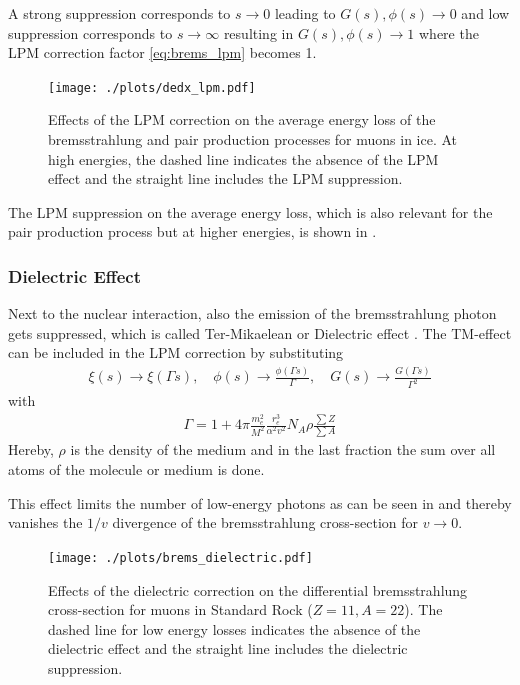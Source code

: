 A strong suppression corresponds to $s \to 0$ leading to $G(s), \phi(s) \to 0$ and low suppression corresponds to $s \to \infty$ resulting in $G(s), \phi(s) \to 1$ where the LPM correction factor \eqref{eq:brems_lpm} becomes 1.
\begin{figure}
    \centering
    \texttt{[image: ./plots/dedx\_lpm.pdf]}
    \caption{Effects of the LPM correction on the average energy loss of the bremsstrahlung and pair production processes for muons in ice. At high energies, the dashed line indicates the absence of the LPM effect and the straight line includes the LPM suppression.}
    \label{fig:dedx_lpm}
\end{figure}

The LPM suppression on the average energy loss, which is also relevant for the pair production process but at higher energies, is shown in .

\subsubsection{Dielectric Effect}

Next to the nuclear interaction, also the emission of the bremsstrahlung photon gets suppressed, which is called Ter-Mikaelean or Dielectric effect \cite{TerMikaelian54, TerMikaelian72}.
The TM-effect can be included in the LPM correction by substituting
\begin{align}
    \xi(s) \to \xi(\Gamma s), \quad
    \phi(s) \to \frac{\phi(\Gamma s)}{\Gamma}, \quad
    G(s) \to \frac{G(\Gamma s)}{\Gamma^2}
\end{align}
with
\begin{align}
    \Gamma = 1 + 4\pi \frac{m_e^2}{M^2} \frac{r_e^3}{\alpha^2v^2} N_A \rho \frac{\sum Z}{\sum A}
\end{align}
Hereby, $\rho$ is the density of the medium and in the last fraction the sum over all atoms of the molecule or medium is done.

This effect limits the number of low-energy photons as can be seen in  and thereby vanishes the $1/v$ divergence of the bremsstrahlung cross-section for $v \to 0$.
\begin{figure}
    \centering
    \texttt{[image: ./plots/brems\_dielectric.pdf]}
    \caption{Effects of the dielectric correction on the differential bremsstrahlung cross-section for muons in Standard Rock ($Z=11, A=22$). The dashed line for low energy losses indicates the absence of the dielectric effect and the straight line includes the dielectric suppression.}
    \label{fig:brems_tm}
\end{figure}

